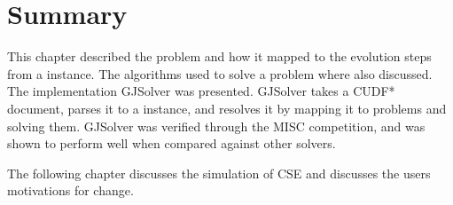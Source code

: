 \section{Summary}
This chapter described the \modelimpl problem and how it mapped to the evolution steps from a \modelname instance.
The algorithms used to solve a \modelimpl problem where also discussed.
The implementation GJSolver was presented.
GJSolver takes a CUDF* document, parses it to a \modelname instance, and resolves it by mapping it to \modelimpl problems and solving them.
GJSolver was verified through the MISC competition, and was shown to perform well when compared against other solvers.

The following chapter discusses the simulation of CSE and discusses the users motivations for change.